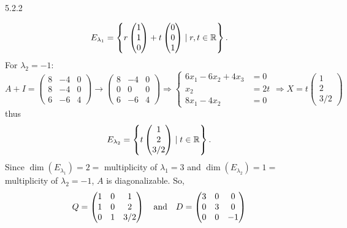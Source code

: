 \documentclass{exam}
\begin{document}
\begin{problem}{5.2.2}
\begin{parts}
      \[
        E_{\lambda_{1}} = \left\{
          r\begin{pmatrix}
            1 \\ 1 \\ 0
          \end{pmatrix}
          + t\begin{pmatrix}
            0 \\ 0 \\ 1
          \end{pmatrix}
          \mid r, t \in \mathbb R
         \right\}.
      \]
      For $\lambda_2 = -1$: 
      \[
          A + I = \begin{pmatrix}
            8 & -4 & 0 \\
            8 & -4 & 0 \\
            6 & -6 & 4
          \end{pmatrix}
          \to \begin{pmatrix}
            8 & -4 & 0 \\
            0 & 0 & 0 \\
            6 & -6 & 4
          \end{pmatrix}
          \Rightarrow \begin{cases}
            6x_1 - 6x_2 + 4x_3 &= 0 \\
            x_2 &= 2t \\
            8x_1 - 4x_2 &= 0
          \end{cases}
          \Rightarrow X = t\begin{pmatrix}
            1 \\ 2 \\ 3/2
          \end{pmatrix}
      \]
      thus 
      \[
        E_{\lambda_{2}} = \left\{
          t\begin{pmatrix}
            1 \\ 2 \\ 3/2
          \end{pmatrix}
          \mid t \in \mathbb R
         \right\}.
      \]
      Since $\dim(E_{\lambda_{1}}) = 2 = $ multiplicity of $\lambda_1 = 3$ and $\dim(E_{\lambda_{2}}) = 1 = $ multiplicity of $\lambda_2 = -1$, $A$ is diagonalizable. So, 
      \[
          Q = \begin{pmatrix}
            1 & 0 & 1 \\
            1 & 0 & 2 \\
            0 & 1 & 3/2
          \end{pmatrix}
          \quad\text{and}\quad 
          D = \begin{pmatrix}
            3 & 0 & 0 \\
            0 & 3 & 0 \\
            0 & 0 & -1
          \end{pmatrix}
      \] 


\end{parts}
\end{problem}
\end{document}
